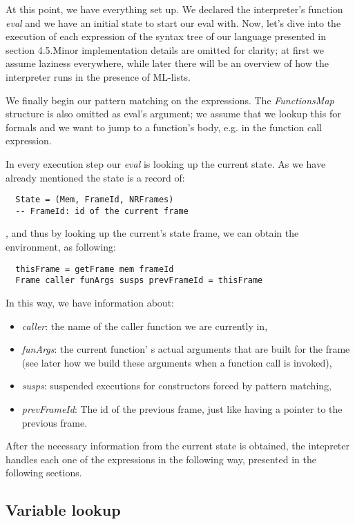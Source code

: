 \documentclass[diploma]{softlab-thesis}
\begin{document}
At this point, we have everything set up. We declared the interpreter's function \textit{eval} and we have an initial 
state to start our eval with. Now, let's dive into the execution of each expression of the syntax tree of our language 
presented in section 4.5.Minor implementation details are omitted for clarity; at first we assume laziness everywhere, 
while later there will be an overview of how the interpreter runs in the presence of ML-lists.
\newline
\par We finally begin our pattern matching on the expressions. The \textit{FunctionsMap} structure is also omitted as 
eval's argument; we assume that we lookup this for formals and we want to jump to a function's body, e.g. in the function  
call expression.

In every execution step our \textit{eval} is looking up the current state. As we have already mentioned the state is 
a record of:
\begin{verbatim}
  State = (Mem, FrameId, NRFrames) 
  -- FrameId: id of the current frame
\end{verbatim}
, and thus by looking up the current's state frame, we can obtain the environment, as following:
\begin{verbatim}
  thisFrame = getFrame mem frameId 
  Frame caller funArgs susps prevFrameId = thisFrame 
\end{verbatim}

In this way, we have information about:
\begin{itemize}
  \item \textit{caller}: the name of the caller function we are currently in,
  \item \textit{funArgs}: the current function' s actual arguments that are built for the frame (see later how we build these 
  arguments when a function call is invoked), 
  \item \textit{susps}: suspended executions for constructors forced by pattern matching, 
  \item \textit{prevFrameId}: The id of the previous frame, just like having a pointer to the previous frame.
\end{itemize}

After the necessary information from the current state is obtained, the intepreter handles each one of the expressions
in the following way, presented in the following sections.

\subsection{Variable lookup}
\end{document}

